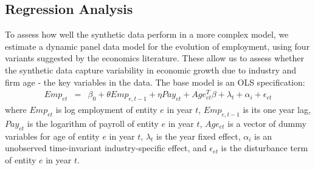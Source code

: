 










\subsection{Regression Analysis}

To assess how well the synthetic data perform in a more complex model, we estimate a dynamic panel data model for the evolution of employment, using four variants suggested by the economics literature. 
These allow us to assess whether the synthetic data capture variability in economic growth due to industry and firm age - the key variables in the data. 
%
The base model is an OLS specification:
%
\begin{eqnarray}	
\label{eq:OLS}
Emp_{et} & = & \beta_0 + \theta Emp_{e,t-1} + \eta Pay_{et} + Age_{et}^{T}\beta + \lambda_t + \alpha_i + \epsilon_{et}
\end{eqnarray}
where $Emp_{et}$ is log employment of entity $e$ in year $t$, $Emp_{e,t-1}$ is its one year lag, $Pay_{et}$ is the logarithm of payroll of entity $e$ in year $t$, $Age_{et}$ is a vector of dummy variables for age of entity $e$ in year $t$, $\lambda_t$ is the year fixed effect, $\alpha_i$ is an unobserved time-invariant industry-specific effect, and $\epsilon_{et}$ is the disturbance term of entity $e$ in year $t$. 


